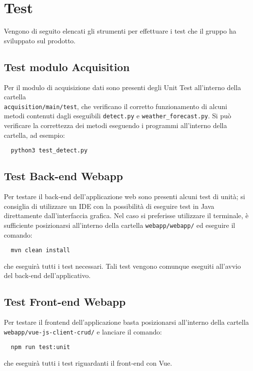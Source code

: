 \chapter{Test}\label{Test}
Vengono di seguito elencati gli strumenti per effettuare i test che il gruppo ha sviluppato sul prodotto.

\section{Test modulo Acquisition}\label{TestModuloAcquisition}
Per il modulo di acquisizione dati sono presenti degli Unit Test all'interno della cartella \\ \texttt{acquisition/main/test}, che verificano il corretto funzionamento di alcuni metodi contenuti dagli eseguibili \texttt{detect.py} e \texttt{weather\_forecast.py}.
Si può verificare la correttezza dei metodi eseguendo i programmi all'interno della cartella, ad esempio:
\begin{lstlisting}
  python3 test_detect.py
\end{lstlisting}

\section{Test Back-end Webapp}\label{TestBackendWebapp}
Per testare il back-end dell'applicazione web sono presenti alcuni test di unità; si consiglia di utilizzare un IDE con la possibilità di eseguire test in Java direttamente dall'interfaccia grafica.
Nel caso si preferisse utilizzare il terminale, è sufficiente posizionarsi all'interno della cartella \texttt{webapp/webapp/} ed eseguire il comando:
\begin{lstlisting}
  mvn clean install
\end{lstlisting}
che eseguirà tutti i test necessari.
Tali test vengono comunque eseguiti all'avvio del back-end dell'applicativo.

\section{Test Front-end Webapp}\label{TestFrontendWebapp}
Per testare il frontend dell'applicazione basta posizionarsi all'interno della cartella \\ \texttt{webapp/vue-js-client-crud/} e lanciare il comando:
\begin{lstlisting}
  npm run test:unit
\end{lstlisting}
che eseguirà tutti i test riguardanti il front-end con Vue.

